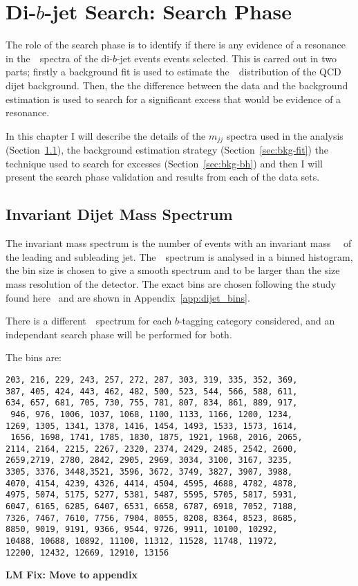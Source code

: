\chapter{Di-$b$-jet Search: Search Phase}
\label{sec:bkg}

The role of the search phase is to identify
if there is any evidence of a resonance
in the~\mjj~spectra of the di-$b$-jet events events selected.
This is carred out in two parts;
firstly a background fit is used to estimate
the~\mjj~distribution of the QCD dijet background.
Then, the the difference between the data
and the background estimation is used 
to search 
for a significant excess that would be evidence
of a resonance.

In this chapter
I will describe
the details of the $m_{jj}$ spectra used in the analysis
(Section~\ref{sec:bkg-mjj}),
the background estimation strategy
(Section~\ref{sec:bkg-fit})
the technique used to search for excesses
(Section~\ref{sec:bkg-bh})
and then I will present the search phase
validation and results from each of the data sets.

\section{Invariant Dijet Mass Spectrum}
\label{sec:bkg-mjj}

The invariant mass spectrum is the number of events
with an invariant mass~\mjj~
of the leading and subleading jet.
The~\mjj~spectrum is analysed in a binned histogram,
the bin size is chosen to give a smooth spectrum
and to be larger than the size mass resolution of the detector.
The exact bins are chosen following the study found here~\cite{dijet-mori16_int}
and are shown in Appendix~\ref{app:dijet_bins}.

There is a different~\mjj~spectrum for each
$b$-tagging category considered,
and an independant search phase will be performed for both.


\noindent
The bins are:
\begin{verbatim}
203, 216, 229, 243, 257, 272, 287, 303, 319, 335, 352, 369,
387, 405, 424, 443, 462, 482, 500, 523, 544, 566, 588, 611, 
634, 657, 681, 705, 730, 755, 781, 807, 834, 861, 889, 917,
 946, 976, 1006, 1037, 1068, 1100, 1133, 1166, 1200, 1234, 
1269, 1305, 1341, 1378, 1416, 1454, 1493, 1533, 1573, 1614,
 1656, 1698, 1741, 1785, 1830, 1875, 1921, 1968, 2016, 2065, 
2114, 2164, 2215, 2267, 2320, 2374, 2429, 2485, 2542, 2600, 
2659,2719, 2780, 2842, 2905, 2969, 3034, 3100, 3167, 3235, 
3305, 3376, 3448,3521, 3596, 3672, 3749, 3827, 3907, 3988, 
4070, 4154, 4239, 4326, 4414, 4504, 4595, 4688, 4782, 4878, 
4975, 5074, 5175, 5277, 5381, 5487, 5595, 5705, 5817, 5931, 
6047, 6165, 6285, 6407, 6531, 6658, 6787, 6918, 7052, 7188, 
7326, 7467, 7610, 7756, 7904, 8055, 8208, 8364, 8523, 8685, 
8850, 9019, 9191, 9366, 9544, 9726, 9911, 10100, 10292, 
10488, 10688, 10892, 11100, 11312, 11528, 11748, 11972, 
12200, 12432, 12669, 12910, 13156
\end{verbatim}
\textbf{LM Fix: Move to appendix}

